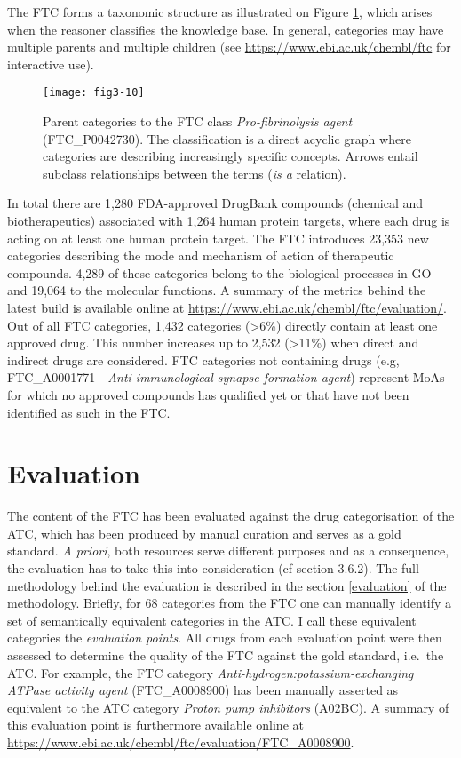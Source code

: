 The FTC forms a taxonomic structure as illustrated on Figure \ref{fig3-10}, which arises when the reasoner classifies the knowledge base. In general, categories may have multiple parents and multiple children (see \url{https://www.ebi.ac.uk/chembl/ftc} for interactive use).

\begin{figure}[ht]
    \centering
    \texttt{[image: fig3-10]}
    \caption{Parent categories to the FTC class \emph{Pro-fibrinolysis agent} (FTC\_P0042730). The classification is a direct acyclic graph where categories are describing increasingly specific concepts. Arrows entail subclass relationships between the terms (\emph{is a} relation).}
    \label{fig3-10}
\end{figure}

In total there are 1,280 FDA-approved DrugBank compounds (chemical and biotherapeutics) associated with 1,264 human protein targets, where each drug is acting on at least one human protein target. The FTC introduces 23,353 new categories describing the mode and mechanism of action of therapeutic compounds. 4,289 of these categories belong to the biological processes in GO and 19,064 to the molecular functions. A summary of the metrics behind the latest build is available online at \url{https://www.ebi.ac.uk/chembl/ftc/evaluation/}. Out of all FTC categories, 1,432 categories (\textgreater 6\%) directly contain at least one approved drug. This number increases up to 2,532 (\textgreater 11\%) when direct and indirect drugs are considered. FTC categories not containing drugs (e.g, FTC\_A0001771 - \emph{Anti-immunological synapse formation agent}) represent MoAs for which no approved compounds has qualified yet or that have not been identified as such in the FTC.

\section{Evaluation}
The content of the FTC has been evaluated against the drug categorisation of the ATC, which has been produced by manual curation and serves as a gold standard. \emph{A priori}, both resources serve different purposes and as a consequence, the evaluation has to take this into consideration (cf section 3.6.2). The full methodology behind the evaluation is described in the section \ref{evaluation} of the methodology. Briefly, for 68 categories from the FTC one can manually identify a set of semantically equivalent categories in the ATC. I call these equivalent categories the \emph{evaluation points}. All drugs from each evaluation point were then assessed to determine the quality of the FTC against the gold standard, i.e.\ the ATC. For example, the FTC category \emph{Anti-hydrogen:potassium-exchanging ATPase activity agent} (FTC\_A0008900) has been manually asserted as equivalent to the ATC category \emph{Proton pump inhibitors} (A02BC). A summary of this evaluation point is furthermore available online at \url{https://www.ebi.ac.uk/chembl/ftc/evaluation/FTC\_A0008900}.

